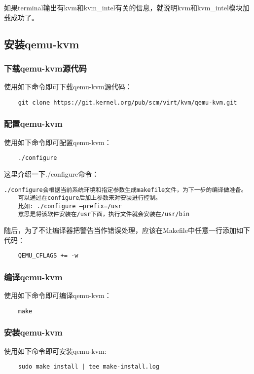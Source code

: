 \documentclass[a4paper,left=2.5cm,right=2.5cm,11pt]{article}
\begin{document}
	如果terminal输出有kvm和kvm\_intel有关的信息，就说明kvm和kvm\_intel模块加载成功了。

\subsection{安装qemu-kvm}

\subsubsection{下载qemu-kvm源代码}
	使用如下命令即可下载qemu-kvm源代码：
	\begin{lstlisting}
	git clone https://git.kernel.org/pub/scm/virt/kvm/qemu-kvm.git
	\end{lstlisting}

\subsubsection{配置qemu-kvm}
	使用如下命令即可配置qemu-kvm：
	\begin{lstlisting}
	./configure
	\end{lstlisting}

	这里介绍一下./configure命令：
	\begin{lstlisting}[numberstyle = \color{white}]
	./configure会根据当前系统环境和指定参数生成makefile文件，为下一步的编译做准备。
	可以通过在configure后加上参数来对安装进行控制。
	比如: ./configure –prefix=/usr 
	意思是将该软件安装在/usr下面，执行文件就会安装在/usr/bin
	\end{lstlisting}

	随后，为了不让编译器把警告当作错误处理，应该在Makefile中任意一行添加如下代码：
	\begin{lstlisting}
	QEMU_CFLAGS += -w
	\end{lstlisting}

\subsubsection{编译qemu-kvm}
	使用如下命令即可编译qemu-kvm：
	\begin{lstlisting}
	make
	\end{lstlisting}

\subsubsection{安装qemu-kvm}
	使用如下命令即可安装qemu-kvm:
	\begin{lstlisting}
	sudo make install | tee make-install.log
	\end{lstlisting}
\end{document}

